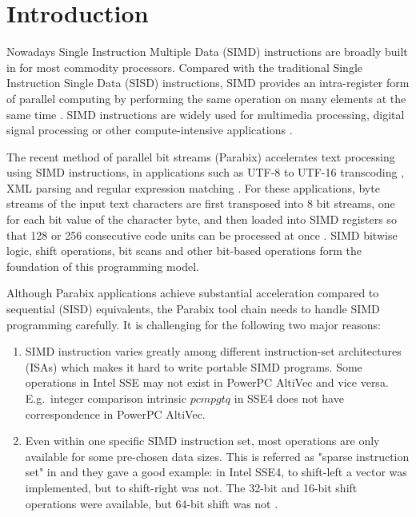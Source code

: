 %
%

\chapter{Introduction}
\label{one}

Nowadays Single Instruction Multiple Data (SIMD) instructions are broadly built in for most commodity processors. Compared with the traditional Single Instruction Single Data (SISD) instructions, SIMD provides an intra-register form of parallel computing by performing the same operation on many elements at the same time \cite{Fisher_phd}. SIMD instructions are widely used for multimedia processing, digital signal processing or other compute-intensive applications \cite{multimedia_simd, dsp_simd}.

The recent method of parallel bit streams (Parabix) accelerates text processing using SIMD instructions, in applications such as UTF-8 to UTF-16 transcoding \cite{rob_u8u16, rob_u8u16_techreport}, XML parsing \cite{medforth_icxml, rob_xml} and regular expression matching \cite{rob_regex}. For these applications, byte streams of the input text characters are first transposed into 8 bit streams, one for each bit value of the character byte, and then loaded into SIMD registers so that 128 or 256 consecutive code units can be processed at once \cite{inductive_doubling_principle}. SIMD bitwise logic, shift operations, bit scans and other bit-based operations form the foundation of this programming model.

Although Parabix applications achieve substantial acceleration compared to sequential (SISD) equivalents, the Parabix tool chain needs to handle SIMD programming carefully. It is challenging for the following two major reasons:

\begin{enumerate}
  \item SIMD instruction varies greatly among different instruction-set architectures (ISAs) which makes it hard to write portable SIMD programs. Some operations in Intel SSE may not exist in PowerPC AltiVec and vice versa. E.g.\ integer comparison intrinsic $pcmpgtq$ in SSE4 does not have correspondence in PowerPC AltiVec.
  \item Even within one specific SIMD instruction set, most operations are only available for some pre-chosen data sizes. This is referred as "sparse instruction set" in \cite{hybrid_simd_type_legalize} and they gave a good example: in Intel SSE4, to shift-left a vector was implemented, but to shift-right was not. The 32-bit and 16-bit shift operations were available, but 64-bit shift was not \cite{hybrid_simd_type_legalize}.
\end{enumerate}

